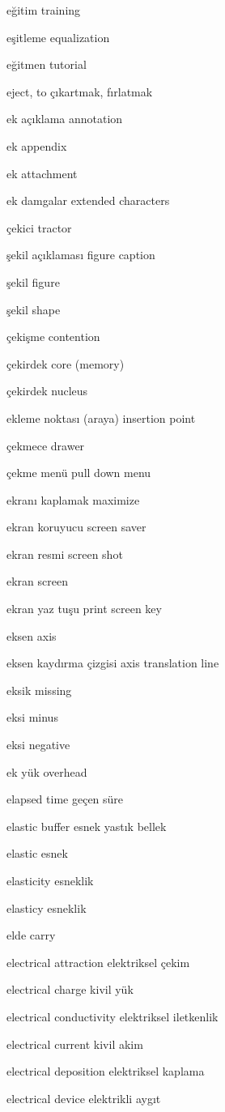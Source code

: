 \documentclass[12pt,fleqn]{article}\usepackage{../../common}
\begin{document}
eğitim training

eşitleme equalization

eğitmen tutorial

eject, to çıkartmak, fırlatmak

ek açıklama annotation

ek appendix

ek attachment

ek damgalar extended characters

çekici tractor

şekil açıklaması figure caption

şekil figure

şekil shape

çekişme contention

çekirdek core (memory)

çekirdek nucleus

ekleme noktası (araya) insertion point

çekmece drawer

çekme menü pull down menu

ekranı kaplamak maximize

ekran koruyucu screen saver

ekran resmi screen shot

ekran screen

ekran yaz tuşu print screen key

eksen axis

eksen kaydırma çizgisi axis translation line

eksik missing

eksi minus

eksi negative

ek yük overhead

elapsed time geçen süre

elastic buffer esnek yastık bellek

elastic esnek

elasticity esneklik

elasticy esneklik

elde carry

electrical attraction elektriksel çekim

electrical charge kivil yük

electrical conductivity elektriksel iletkenlik

electrical current kivil akim

electrical deposition elektriksel kaplama

electrical device elektrikli aygıt
\end{document}
